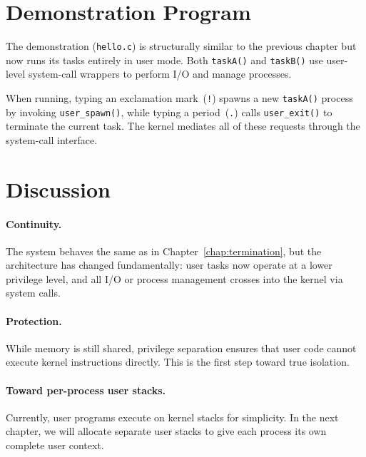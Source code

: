 \section{Demonstration Program}

The demonstration (\texttt{hello.c}) is structurally similar to the previous
chapter but now runs its tasks entirely in user mode.  Both \texttt{taskA()} and
\texttt{taskB()} use user-level system-call wrappers to perform I/O and manage
processes.

When running, typing an exclamation mark~(\texttt{!}) spawns a new
\texttt{taskA()} process by invoking \texttt{user\_spawn()}, while typing a
period~(\texttt{.}) calls \texttt{user\_exit()} to terminate the current task.
The kernel mediates all of these requests through the system-call interface.

\begin{figure}[H]
\centering

\end{figure}

\section{Discussion}

\paragraph{Continuity.}
The system behaves the same as in Chapter~\ref{chap:termination}, but the
architecture has changed fundamentally: user tasks now operate at a lower
privilege level, and all I/O or process management crosses into the kernel via
system calls.

\paragraph{Protection.}
While memory is still shared, privilege separation ensures that user code cannot
execute kernel instructions directly.  This is the first step toward true
isolation.

\paragraph{Toward per-process user stacks.}
Currently, user programs execute on kernel stacks for simplicity.  In the next
chapter, we will allocate separate user stacks to give each process its own
complete user context.

